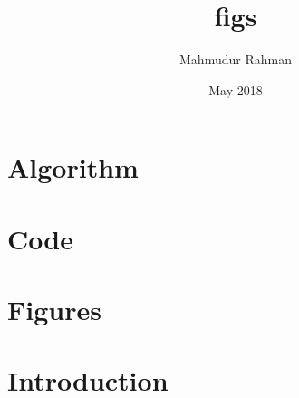 \documentclass{article}
\title{figs}
\author{Mahmudur Rahman}
\date{May 2018}
\begin{document}
\maketitle

\section{Algorithm}
\label{sec:algo}


\section{Code}


\section{Figures}


\section{Introduction}

\end{document}
